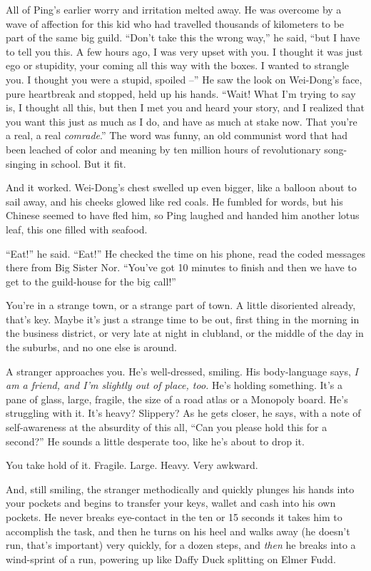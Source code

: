 All of Ping's earlier worry and irritation melted away. He was
overcome by a wave of affection for this kid who had travelled
thousands of kilometers to be part of the same big guild. ``Don't
take this the wrong way,'' he said, ``but I have to tell you this. A
few hours ago, I was very upset with you. I thought it was just ego
or stupidity, your coming all this way with the boxes. I wanted to
strangle you. I thought you were a stupid, spoiled --'' He saw the
look on Wei-Dong's face, pure heartbreak and stopped, held up his
hands. ``Wait! What I'm trying to say is, I thought all this, but
then I met you and heard your story, and I realized that you want
this just as much as I do, and have as much at stake now. That
you're a real, a real \emph{comrade}.'' The word was funny, an old
communist word that had been leached of color and meaning by ten
million hours of revolutionary song-singing in school. But it fit.

And it worked. Wei-Dong's chest swelled up even bigger, like a
balloon about to sail away, and his cheeks glowed like red coals.
He fumbled for words, but his Chinese seemed to have fled him, so
Ping laughed and handed him another lotus leaf, this one filled
with seafood.

``Eat!'' he said. ``Eat!'' He checked the time on his phone, read the
coded messages there from Big Sister Nor. ``You've got 10 minutes to
finish and then we have to get to the guild-house for the big
call!''

\tb

You're in a strange town, or a strange part of town. A little
disoriented already, that's key. Maybe it's just a strange time to
be out, first thing in the morning in the business district, or
very late at night in clubland, or the middle of the day in the
suburbs, and no one else is around.

A stranger approaches you. He's well-dressed, smiling. His
body-language says,
\emph{I am a friend, and I'm slightly out of place, too.} He's
holding something. It's a pane of glass, large, fragile, the size
of a road atlas or a Monopoly board. He's struggling with it. It's
heavy? Slippery? As he gets closer, he says, with a note of
self-awareness at the absurdity of this all, ``Can you please hold
this for a second?'' He sounds a little desperate too, like he's
about to drop it.

You take hold of it. Fragile. Large. Heavy. Very awkward.

And, still smiling, the stranger methodically and quickly plunges
his hands into your pockets and begins to transfer your keys,
wallet and cash into his own pockets. He never breaks eye-contact
in the ten or 15 seconds it takes him to accomplish the task, and
then he turns on his heel and walks away (he doesn't run, that's
important) very quickly, for a dozen steps, and \emph{then} he
breaks into a wind-sprint of a run, powering up like Daffy Duck
splitting on Elmer Fudd.

